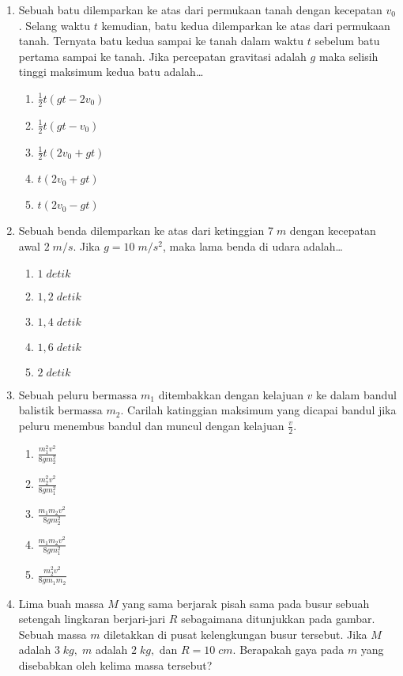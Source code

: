 \documentclass[A4,12PT, english, twocolumn]{journal}
\begin{document}
\begin{enumerate}
\item Sebuah batu dilemparkan ke atas dari permukaan tanah dengan kecepatan $v_0$. Selang waktu $t$ kemudian, batu kedua dilemparkan ke atas dari permukaan tanah. Ternyata batu kedua sampai ke tanah dalam waktu $t$ sebelum batu pertama sampai ke tanah. Jika percepatan gravitasi adalah $g$ maka selisih tinggi maksimum kedua batu adalah\dots
    \begin{enumerate}
        \item $\frac{1}{2}t (gt-2v_0)$
        \item $\frac{1}{2}t (gt-v_0)$
        \item $\frac{1}{2}t (2v_0+gt)$
        \item $t(2v_0+gt)$
        \item $t(2v_0-gt)$
    \end{enumerate}
   
\item Sebuah benda dilemparkan ke atas dari ketinggian $7 \; m$ dengan kecepatan awal $2 \; m/s$. Jika $g= 10 \; m/s^2$, maka lama benda di udara adalah\dots
    \begin{enumerate}
        \item $1 \; detik$
        \item $1,2 \; detik$
        \item $1,4 \; detik$
        \item $1,6 \; detik$
        \item $2 \; detik$
    \end{enumerate}

\item Sebuah peluru bermassa $m_1$ ditembakkan dengan kelajuan $v$ ke dalam bandul balistik bermassa $m_2$. Carilah katinggian maksimum yang dicapai bandul jika peluru menembus bandul dan muncul dengan kelajuan $\frac{v}{2}$.
    \begin{enumerate}
        \item $\frac{m_1^2 v^2}{8gm_2^2}$
        \item $\frac{m_2^2 v^2}{8gm_1^2}$
        \item $\frac{m_1 m_2 v^2}{8gm_2^2}$
        \item $\frac{m_1 m_2 v^2}{8gm_1^2}$
        \item $\frac{m_2^2 v^2}{8g m_1 m_2}$
    \end{enumerate}

\item Lima buah massa $M$ yang sama berjarak pisah sama pada busur sebuah setengah lingkaran berjari-jari $R$ sebagaimana ditunjukkan pada gambar. Sebuah massa $m$ diletakkan di pusat kelengkungan busur tersebut. Jika $M$ adalah $3 \; kg, \; m$ adalah $2 \; kg,$ dan $R= 10 \; cm$. Berapakah gaya pada $m$ yang disebabkan oleh kelima massa tersebut?
\begin{center}
    \begin{tikzpicture}[scale=0.8]
        

\end{tikzpicture}
\end{center}
\end{enumerate}
\end{document}
